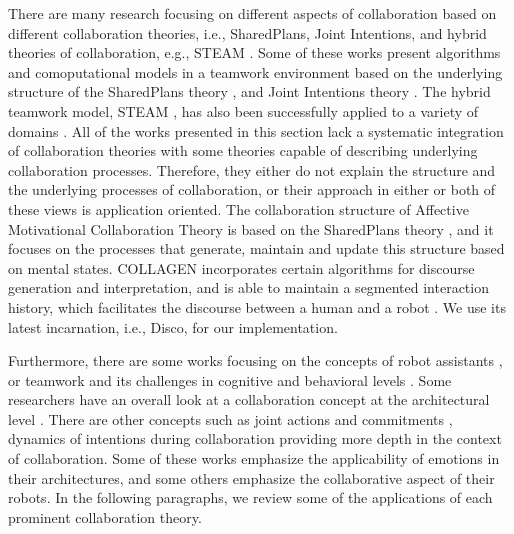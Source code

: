There are many research focusing on different aspects of collaboration based on
different collaboration theories, i.e., SharedPlans, Joint Intentions, and
hybrid theories of collaboration, e.g., STEAM \cite{tambe:flexible-teamwork}.
Some of these works present algorithms and comoputational models in a
teamwork environment based on the underlying structure of the SharedPlans theory
\cite{lochbaum:collaborative-planning,lochbaum:plan-models,yen:cast,yin:knowledge-based-sharedplans},
and Joint Intentions theory
\cite{breazeal:humanoid-robots,mutlu:coordination-robot}. The hybrid teamwork
model, STEAM \cite{tambe:flexible-teamwork}, has also been successfully applied
to a variety of domains
\cite{kabil:coordination-mechanisms,kitano:robocup,marsella:robocup,scerri:robot-agent-person}.
All of the works presented in this section lack a systematic integration of
collaboration theories with some theories capable of describing underlying
collaboration processes. Therefore, they either do not explain the structure and
the underlying processes of collaboration, or their approach in either or both
of these views is application oriented. The collaboration structure of Affective
Motivational Collaboration Theory is based on the SharedPlans theory
\cite{grosz:planning-acting,grosz:collaboration,grosz:plans-discourse}, and it
focuses on the processes that generate, maintain and update this structure based
on mental states. COLLAGEN \cite{rich:collaboration-manager,rich:discourse} 
incorporates certain algorithms for discourse generation and interpretation, and
is able to maintain a segmented interaction history, which facilitates the
discourse between a human and a robot \cite{rickel:discourse-theory-dialogue}.
We use its latest incarnation, i.e., Disco, for our implementation.

Furthermore, there are some works focusing on the concepts of robot assistants
\cite{clancey:agent-assistants-collaboration}, or teamwork and its challenges in
cognitive and behavioral levels
\cite{nikolaidis:collaboration-joint-action,scerri:prototype-distributed-teams}.
Some researchers have an overall look at a collaboration concept at the
architectural level
\cite{esau:integrating-emotion-collaboration,garcia:collaboration-emotional-awareness,sofge:collaboration-humanoid-space}.
There are other concepts such as joint actions and commitments
\cite{grosz:intention-dynamics-collaboration}, dynamics of intentions during
collaboration \cite{levesque:acting-together} providing more depth in the
context of collaboration. Some of these works emphasize the applicability of
emotions in their architectures, and some others emphasize the collaborative
aspect of their robots. In the following paragraphs, we review some of the
applications of each prominent collaboration theory.

